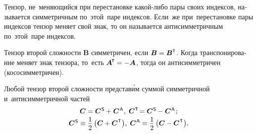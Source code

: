 

\label{para:tensors.symmetric+skewsymmetric}

\begin{otherlanguage}{russian}

Тензор, не~меняющийся при перестановке какой\hbox{-}либо пары своих индексов, называется симметричным по~этой~паре индексов. Если~же при~перестановке пары индексов тензор меняет свой знак, то он называется антисимметричным по~этой~паре индексов.

Тензор второй сложности ${\bm{B}}$ симметричен, если ${\bm{B} = \bm{B}^\T}$. Когда транспонирование меняет знак тензора, то~есть ${\bm{A}^{\hspace{-0.1em}\T} = - \bm{A}}$, тогда он антисимметричен (кососимметричен).

Любой тензор второй сложности представ\'{и}м суммой симметричной и~антисимметричной частей
\vspace{0.2em}\begin{equation}\begin{array}{c}
\bm{C} = \bm{C}^{\mathsf{\hspace{0.1ex}S}} \hspace{-0.1ex}+\hspace{0.1ex} \bm{C}^{\mathsf{\hspace{0.1ex}A}}\hspace{0.1ex} , \;
\bm{C}^{\hspace{0.1ex}\T} \hspace{-0.32ex} = \bm{C}^{\mathsf{\hspace{0.1ex}S}} \hspace{-0.1ex}-\hspace{0.1ex} \bm{C}^{\mathsf{\hspace{0.1ex}A}}\hspace{0.2ex} ; \\[0.2em]
\bm{C}^{\mathsf{\hspace{0.1ex}S}} \equiv \displaystyle \onehalf \left({\bm{C} + \bm{C}^{\hspace{0.1ex}\T}}\hspace{0.1ex}\right)\!, \;
\bm{C}^{\mathsf{\hspace{0.1ex}A}} \equiv \displaystyle \onehalf \left({\bm{C} - \bm{C}^{\hspace{0.1ex}\T}}\hspace{0.1ex}\right)\!.
\end{array}\end{equation}


\end{otherlanguage}
